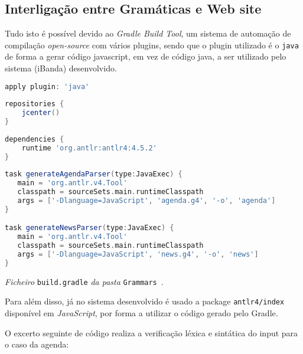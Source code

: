 \subsection{Interligação entre Gramáticas e Web site}

Tudo isto é possível devido ao \textit{Gradle Build Tool}, um sistema de automação de compilação \textit{open-source} com vários plugins, sendo que o plugin utilizado é o \texttt{java} de forma a gerar código javascript, em vez de código java, a ser utilizado pelo sistema (iBanda) desenvolvido.

\begin{framed}
\begin{lstlisting}[language=gradle]
apply plugin: 'java'
 
repositories {
    jcenter()
}
 
dependencies {
    runtime 'org.antlr:antlr4:4.5.2'
}
 
task generateAgendaParser(type:JavaExec) {
   main = 'org.antlr.v4.Tool'
   classpath = sourceSets.main.runtimeClasspath
   args = ['-Dlanguage=JavaScript', 'agenda.g4', '-o', 'agenda']
}

task generateNewsParser(type:JavaExec) {
   main = 'org.antlr.v4.Tool'
   classpath = sourceSets.main.runtimeClasspath
   args = ['-Dlanguage=JavaScript', 'news.g4', '-o', 'news']
}
\end{lstlisting}
\end{framed}
\begin{center}
\textit{Ficheiro} \texttt{build.gradle} \textit{da pasta} \texttt{Grammars}~\cite{AW}.
\end{center}

Para além disso, já no sistema desenvolvido é usado a package \texttt{antlr4/index} disponível em \textit{JavaScript}, por forma a utilizar o código gerado pelo Gradle. 

O excerto seguinte de código realiza a verificação léxica e sintática do input para o caso da agenda:

